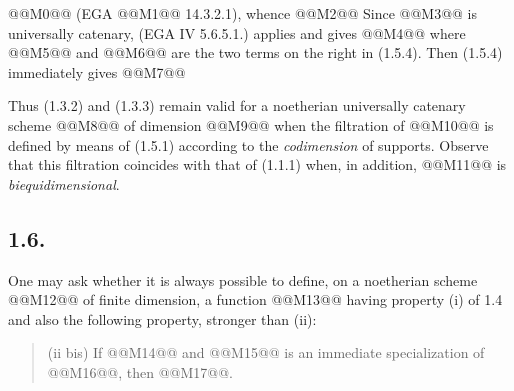 
@@M0@@
(EGA @@M1@@ 14.3.2.1), whence
@@M2@@
Since @@M3@@ is universally catenary, (EGA IV 5.6.5.1.) applies and gives
@@M4@@
where @@M5@@ and @@M6@@ are the two terms on the right in (1.5.4). Then (1.5.4) immediately gives
@@M7@@

Thus (1.3.2) and (1.3.3) remain valid for a noetherian universally catenary scheme @@M8@@ of dimension @@M9@@ when the filtration of @@M10@@ is defined by means of (1.5.1) according to the \emph{codimension} of supports. Observe that this filtration coincides with that of (1.1.1) when, in addition, @@M11@@ is \emph{biequidimensional}.

\subsection*{1.6.}
One may ask whether it is always possible to define, on a noetherian scheme @@M12@@ of finite dimension, a function @@M13@@ having property (i) of 1.4 and also the following property, stronger than (ii):
\begin{quote}
(ii bis) If @@M14@@ and @@M15@@ is an immediate specialization of @@M16@@, then @@M17@@.
\end{quote}


